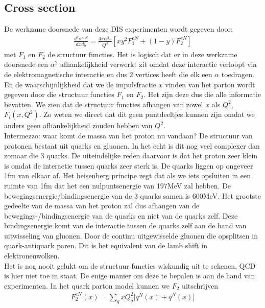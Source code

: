\documentclass[../main.tex]{subfiles}
\begin{document}
\subsection{Cross section}%
\label{sub:cross_section}

De werkzame doorsnede van deze DIS experimenten wordt gegeven door:
\begin{equation}
    \begin{aligned}
        \label{eq:dis_werkzame_doorsnede}
        \frac{d^2\sigma^{e,N}}{dxdy} = \frac{4\pi\alpha^2s}{Q^4} [xy^2F_1^{eN}+(1-y)F_2^{eN}]
    \end{aligned}
\end{equation}
met $F_1$ en $F_2$ de structuur functies. Het is logisch dat er in deze werkzame doorsnede een $\alpha^2$ afhankelijkheid verwerkt zit omdat deze interactie verloopt via de elektromagnetische interactie en dus 2 vertices heeft die elk een $\alpha$ toedragen. En de waarschijnlijkheid dat we de impulsfractie $x$ vinden van het parton wordt gegeven door die structuur functies $F_1$ en $F_2$. Het zijn deze dus die alle informatie bevatten. We zien dat de structuur functies afhangen van zowel $x$ als $Q^2$, $F_i(x, Q^2)$. Zo weten we direct dat dit geen puntdeeltjes kunnen zijn omdat we anders geen afhankelijkheid zouden hebben van $Q^2$.\\
{\color{blue}Intermezzo: waar komt de massa van het proton nu vandaan? De structuur van protonen bestaat uit quarks en gluonen. In het echt is dit nog veel complexer dan zomaar die 3 quarks. De uiteindelijke reden daarvoor is dat het proton zeer klein is omdat de interactie tussen quarks zeer sterk is. De quarks liggen op ongeveer 1fm van elkaar af. Het heisenberg principe zegt dat als we iets opsluiten in een ruimte van 1fm dat het een nulpuntsenergie van 197MeV zal hebben. De bewegingsenergie/bindingsenergie van de 3 quarks samen is 600MeV. Het grootste gedeelte van de massa van het proton zal dus afhangen van de bewegings-/bindingsenergie van de quarks en niet van de quarks zelf. Deze bindingsenergie komt van de interactie tussen de quarks zelf aan de hand van uitwisseling van gluonen. Door de continu uitgewisselde gluonen die opsplitsen in quark-antiquark paren. Dit is het equivalent van de lamb shift in elektronenwolken.}\\
Het is nog nooit gelukt om de structuur functies wiskundig uit te rekenen, QCD is hier niet toe in staat. De enige manier om deze te bepalen is aan de hand van experimenten. In het quark parton model kunnen we $F_2$ uitschrijven
\begin{equation}
    \begin{aligned}
        \label{eq:tweede_structuur_functie}
        F_2^{eN}(x)=\sum_q xQ_q^2|q^N(x)+\overline q^N (x)]
    \end{aligned}
\end{equation}
\end{document}
